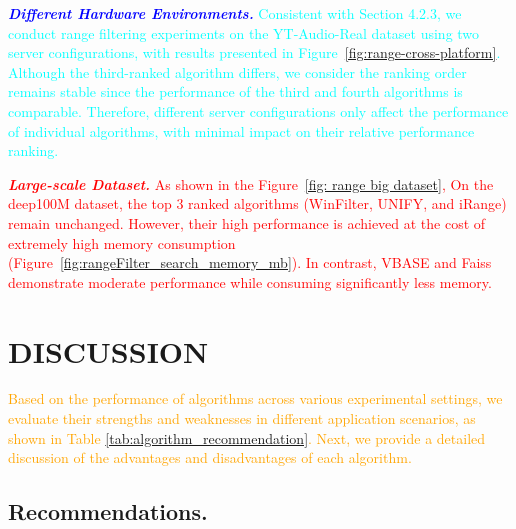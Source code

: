 \documentclass[sigconf, nonacm]{acmart}
\begin{document}
{	\textit{\textbf{\textcolor{blue}{Different Hardware Environments.}}} 
	\textcolor{cyan}{Consistent with Section 4.2.3, we conduct range filtering experiments on the YT-Audio-Real dataset using two server configurations, with results presented in Figure~\ref{fig:range-cross-platform}. Although the third-ranked algorithm differs, we consider the ranking order remains stable since the performance of the third and fourth algorithms is comparable. Therefore, different server configurations only affect the performance of individual algorithms, with minimal impact on their relative performance ranking.}  
	
	\textit{\textbf{\textcolor{red}{Large-scale Dataset.}}} \textcolor{red}{As shown in the Figure~\ref{fig: range big dataset}, On the deep100M dataset, the top 3 ranked algorithms (WinFilter, UNIFY, and iRange) remain unchanged. However, their high performance is achieved at the cost of extremely high memory consumption (Figure~\ref{fig:rangeFilter_search_memory_mb}). In contrast, VBASE and Faiss demonstrate moderate performance while consuming significantly less memory.}
	
	
	\section{DISCUSSION}
	\textcolor{orange}{Based on the performance of algorithms across various experimental settings, we evaluate their strengths and weaknesses in different application scenarios, as shown in Table \ref{tab:algorithm_recommendation}. Next, we provide a detailed discussion of the advantages and disadvantages of each algorithm.}
	
	
	
	\subsection{Recommendations.}
	
}
\end{document}
